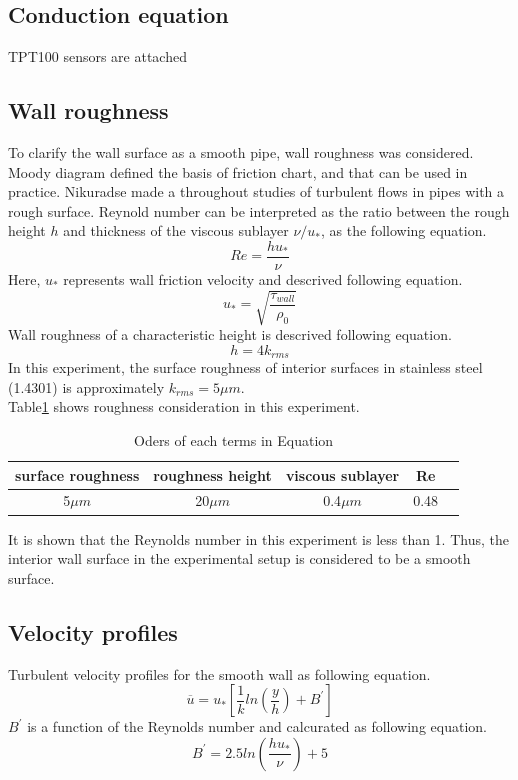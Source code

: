 \documentclass[conference]{IEEEtran}
\begin{document}
\subsection{Conduction equation}
TPT100 sensors are attached
\subsection{Wall roughness}
To clarify the wall surface as a smooth pipe, wall roughness was considered.
Moody diagram defined the basis of friction chart, and that can be used in practice.
Nikuradse made a throughout studies of turbulent flows in pipes with a rough surface.
Reynold number can be interpreted as the ratio between the rough height $h$ and thickness of the viscous sublayer $\nu/u_{*}$, as the following equation.
\begin{equation}
    Re=\frac{hu_{*}}{\nu}
\end{equation}
Here, $u_{*}$ represents wall friction velocity and descrived following equation.
\begin{equation}
    u_{*}=\sqrt{\frac{\tau_{wall}}{\rho_{0}}}
\end{equation}
Wall roughness of a characteristic height is descrived following equation.
\begin{equation}
    h = 4k_{rms}
\end{equation}
In this experiment, the surface roughness of interior surfaces in stainless steel (1.4301) is approximately $k_{rms} = 5\mu m$.\\
Table\ref{wall_roughness} shows roughness consideration in this experiment.
\begin{table}[h]
    \caption{Oders of each terms in Equation}
    \label{wall_roughness}
    \centering
    \begin{tabular}{ccccc}
        \hline
        surface roughness & roughness height & viscous sublayer & Re \\
        \hline
        5$\mu m$ & 20$\mu m$ & 0.4$\mu m$ & 0.48
    \end{tabular}
\end{table}
It is shown that the Reynolds number in this experiment is less than 1.
Thus, the interior wall surface in the experimental setup is considered to be a smooth surface.

\subsection{Velocity profiles}
Turbulent velocity profiles for the smooth wall as following equation.
\begin{equation}
    \overline{u} = u_{*} \left[\frac{1}{k}ln\left(\frac{y}{h}\right)+B^{\prime}\right]
\end{equation}
$B^{\prime}$ is a function of the Reynolds number and calcurated as following equation.
\begin{equation}
    B^{\prime} = 2.5 ln\left(\frac{hu_{*}}{\nu}\right)+5
\end{equation}
\end{document}
